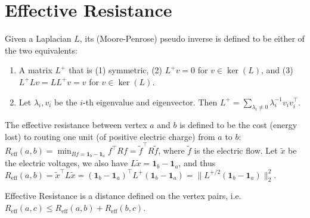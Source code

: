 \section{Effective Resistance}

Given a Laplacian $L$, its (Moore-Penrose) pseudo inverse is defined to be either of the two equivalents:
\begin{enumerate}
    \item A matrix $L^+$ that is (1) symmetric, (2) $L^+ v=0$ for $v \in \ker(L)$, and (3) $L^+ L v = L L^+ v = v$ for  $v \in \ker(L)$.
    \item Let $\lambda_i, v_i$ be the $i$-th eigenvalue and eigenvector. Then $L^+ = \sum_{\lambda_i \ne 0} \lambda_i^{-1} v_i v_i^\top$.
\end{enumerate}

The effective resistance between vertex $a$ and $b$ is defined to be the cost (energy lost) to routing one unit (of positive electric charge) from $a$ to $b$: $R_{\text{eff}}(a,b) = \min_{Bf = \boldsymbol{1}_b - \boldsymbol{1}_a} f^\top R f = \tilde{f}^\top R \tilde{f}$, where $\tilde{f}$ is the electric flow. Let $\tilde{x}$ be the electric voltages, we also have $L\tilde{x} = \boldsymbol{1}_b - \boldsymbol{1}_a$, and thus $R_{\text{eff}}(a,b) = \tilde{x}^\top L \tilde{x} = (\boldsymbol{1}_b - \boldsymbol{1}_a)^\top L^+ (\boldsymbol{1}_b - \boldsymbol{1}_a) = \|L^{+/2} (\boldsymbol{1}_b - \boldsymbol{1}_a)\|_2^2$.

Effective Resistance is a distance defined on the vertex pairs, i.e. $R_{\text{eff}}(a,c) \le R_{\text{eff}}(a,b) + R_{\text{eff}}(b,c)$.